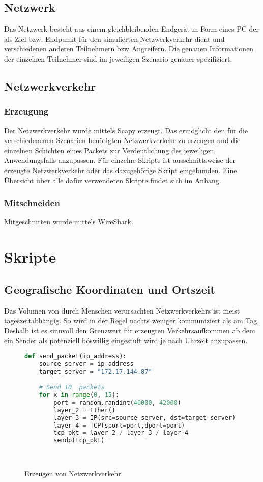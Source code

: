 \subsection{Netzwerk}
Das Netzwerk besteht aus einem gleichbleibenden Endgerät in Form eines PC der als Ziel bzw. Endpunkt für den simulierten Netzwerkverkehr dient und verschiedenen anderen Teilnehmern bzw Angreifern. Die genauen Informationen der einzelnen Teilnehmer sind im jeweiligen Szenario genauer spezifiziert.
\subsection{Netzwerkverkehr}
\subsubsection{Erzeugung}
Der Netzwerkverkehr wurde mittels Scapy erzeugt. Das ermöglicht den für die verschiedenenen Szenarien benötigten Netzwerkverkehr zu erzeugen und die einzelnen Schichten eines Packets zur Verdeutlichung des jeweiligen Anwendungsfalls anzupassen. Für einzelne Skripte ist ausschnittsweise der erzeugte Netzwerkverkehr oder das dazugehörige Skript eingebunden. Eine Übersicht über alle dafür verwendeten Skripte findet sich im Anhang.
\subsubsection{Mitschneiden}
Mitgeschnitten wurde mittels WireShark.

\section{Skripte}
\subsection{Geografische Koordinaten und Ortszeit}
Das Volumen von durch Menschen verursachten Netzwerkverkehrs ist meist tageszeitabhängig. So wird in der Regel nachts weniger kommuniziert als am Tag.  Deshalb ist es sinnvoll den Grenzwert für erzeugten Verkehrsaufkommen ab dem ein Sender als potenziell böswillig eingestuft wird je nach Uhrzeit anzupassen.\\
\begin{figure}[h!]

\begin{lstlisting}[language=python]
def send_packet(ip_address):
    source_server = ip_address
    target_server = "172.17.144.87"

    # Send 10  packets
    for x in range(0, 15):
        port = random.randint(40000, 42000)
        layer_2 = Ether()
        layer_3 = IP(src=source_server, dst=target_server)
        layer_4 = TCP(sport=port,dport=port)
        tcp_pkt = layer_2 / layer_3 / layer_4
        sendp(tcp_pkt)
\end{lstlisting}
\caption{Erzeugen von Netzwerkverkehr}\\
\end{figure}

